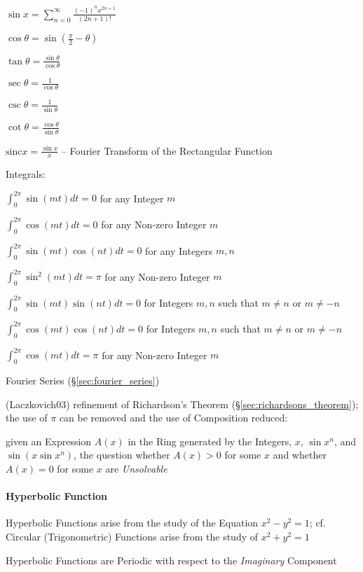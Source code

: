 $\sin x = \sum_{n=0}^\infty \frac{(-1)^n x^{2n+1}}{(2n + 1)!}$

$\cos\theta= \sin(\frac{\pi}{2} - \theta)$

$\tan\theta = \frac{\sin\theta}{\cos\theta}$

$\sec\theta = \frac{1}{\cos\theta}$

$\csc\theta = \frac{1}{\sin\theta}$

$\cot\theta = \frac{\cos\theta}{\sin\theta}$

$\mathrm{sinc} x = \frac{\sin x}{x}$ -- Fourier Transform of the Rectangular
Function

Integrals:

$\int_0^{2\pi} \sin(mt)dt = 0$ for any Integer $m$

$\int_0^{2\pi} \cos(mt)dt = 0$ for any Non-zero Integer $m$

$\int_0^{2\pi} \sin(mt)\cos(nt)dt = 0$ for any Integers $m,n$

$\int_0^{2\pi} \sin^2(mt)dt = \pi$ for any Non-zero Integer $m$

$\int_0^{2\pi} \sin(mt)\sin(nt)dt = 0$ for Integers $m,n$ such that $m\neq{n}$
or $m\neq{-n}$

$\int_0^{2\pi} \cos(mt)\cos(nt)dt = 0$ for Integers $m,n$ such that $m\neq{n}$
or $m\neq{-n}$

$\int_0^{2\pi} \cos(mt)dt = \pi$ for any Non-zero Integer $m$

\fist Fourier Series (\S\ref{sec:fourier_series})

(Laczkovich03) refinement of Richardson's Theorem
(\S\ref{sec:richardsons_theorem}); the use of $\pi$ can be removed and the use
of Composition reduced:

given an Expression $A(x)$ in the Ring generated by the Integers, $x$, $\sin
x^n$, and $\sin(x \sin x^n)$, the question whether $A(x) > 0$ for some $x$ and
whether $A(x) = 0$ for some $x$ are \emph{Unsolvable}



\paragraph{Hyperbolic Function}\label{sec:hyperbolic_function}\hfill

Hyperbolic Functions arise from the study of the Equation $x^2 - y^2 = 1$; cf.
Circular (Trigonometric) Functions arise from the study of $x^2 + y^2 = 1$

Hyperbolic Functions are Periodic with respect to the \emph{Imaginary}
Component

